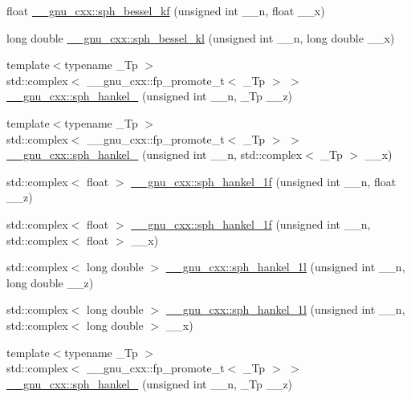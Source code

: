 \begin{DoxyCompactItemize}
\item 
float \hyperlink{group__gnu__math__spec__func_gaf886e8f8dfd2af0c4a9c5929d193d12f}{\+\_\+\+\_\+gnu\+\_\+cxx\+::sph\+\_\+bessel\+\_\+kf} (unsigned int \+\_\+\+\_\+n, float \+\_\+\+\_\+x)
\item 
long double \hyperlink{group__gnu__math__spec__func_ga22f6a73e50e7020a7c2fa64ce1b9be41}{\+\_\+\+\_\+gnu\+\_\+cxx\+::sph\+\_\+bessel\+\_\+kl} (unsigned int \+\_\+\+\_\+n, long double \+\_\+\+\_\+x)
\item 
{\footnotesize template$<$typename \+\_\+\+Tp $>$ }\\std\+::complex$<$ \+\_\+\+\_\+gnu\+\_\+cxx\+::fp\+\_\+promote\+\_\+t$<$ \+\_\+\+Tp $>$ $>$ \hyperlink{group__gnu__math__spec__func_ga4424f565fb224ab88b177beb65d08305}{\+\_\+\+\_\+gnu\+\_\+cxx\+::sph\+\_\+hankel\+\_} (unsigned int \+\_\+\+\_\+n, \+\_\+\+Tp \+\_\+\+\_\+z)
\item 
{\footnotesize template$<$typename \+\_\+\+Tp $>$ }\\std\+::complex$<$ \+\_\+\+\_\+gnu\+\_\+cxx\+::fp\+\_\+promote\+\_\+t$<$ \+\_\+\+Tp $>$ $>$ \hyperlink{group__gnu__math__spec__func_ga3d256857c000a966e89526cb99253aca}{\+\_\+\+\_\+gnu\+\_\+cxx\+::sph\+\_\+hankel\+\_} (unsigned int \+\_\+\+\_\+n, std\+::complex$<$ \+\_\+\+Tp $>$ \+\_\+\+\_\+x)
\item 
std\+::complex$<$ float $>$ \hyperlink{group__gnu__math__spec__func_ga70d4fc01069f3f0ac0e3b52fe1dffea4}{\+\_\+\+\_\+gnu\+\_\+cxx\+::sph\+\_\+hankel\+\_\+1f} (unsigned int \+\_\+\+\_\+n, float \+\_\+\+\_\+z)
\item 
std\+::complex$<$ float $>$ \hyperlink{group__gnu__math__spec__func_gadbb875cd50abb62ac75386143486bb2c}{\+\_\+\+\_\+gnu\+\_\+cxx\+::sph\+\_\+hankel\+\_\+1f} (unsigned int \+\_\+\+\_\+n, std\+::complex$<$ float $>$ \+\_\+\+\_\+x)
\item 
std\+::complex$<$ long double $>$ \hyperlink{group__gnu__math__spec__func_ga6e77fd5cddfbd57d9120b20fc6c30e6f}{\+\_\+\+\_\+gnu\+\_\+cxx\+::sph\+\_\+hankel\+\_\+1l} (unsigned int \+\_\+\+\_\+n, long double \+\_\+\+\_\+z)
\item 
std\+::complex$<$ long double $>$ \hyperlink{group__gnu__math__spec__func_ga3e9d889d8f2e4792e892b12b1f5948b9}{\+\_\+\+\_\+gnu\+\_\+cxx\+::sph\+\_\+hankel\+\_\+1l} (unsigned int \+\_\+\+\_\+n, std\+::complex$<$ long double $>$ \+\_\+\+\_\+x)
\item 
{\footnotesize template$<$typename \+\_\+\+Tp $>$ }\\std\+::complex$<$ \+\_\+\+\_\+gnu\+\_\+cxx\+::fp\+\_\+promote\+\_\+t$<$ \+\_\+\+Tp $>$ $>$ \hyperlink{group__gnu__math__spec__func_ga1ca08866a25e3637b04c57ff5a0c36a5}{\+\_\+\+\_\+gnu\+\_\+cxx\+::sph\+\_\+hankel\+\_} (unsigned int \+\_\+\+\_\+n, \+\_\+\+Tp \+\_\+\+\_\+z)

\end{DoxyCompactItemize}
